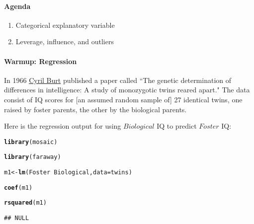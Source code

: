 \documentclass[10pt]{article}\usepackage[]{graphicx}\usepackage[]{color}
\makeatletter
\newcommand{\hlopt}[1]{\textcolor[rgb]{0,0,0}{#1}}%
\newcommand{\hlstd}[1]{\textcolor[rgb]{0.345,0.345,0.345}{#1}}%
\newcommand{\hlkwb}[1]{\textcolor[rgb]{0.69,0.353,0.396}{#1}}%
\newcommand{\hlkwc}[1]{\textcolor[rgb]{0.333,0.667,0.333}{#1}}%
\newcommand{\hlkwd}[1]{\textcolor[rgb]{0.737,0.353,0.396}{\textbf{#1}}}%
\newenvironment{kframe}{%
 \def\at@end@of@kframe{}%
 \ifinner\ifhmode%
  \def\at@end@of@kframe{\end{minipage}}%
  \begin{minipage}{\columnwidth}%
 \fi\fi%
 \def\FrameCommand##1{\hskip\@totalleftmargin \hskip-\fboxsep
 \colorbox{shadecolor}{##1}\hskip-\fboxsep
     \hskip-\linewidth \hskip-\@totalleftmargin \hskip\columnwidth}%
 \MakeFramed {\advance\hsize-\width
   \@totalleftmargin\z@ \linewidth\hsize
   \@setminipage}}%
 {\par\unskip\endMakeFramed%
 \at@end@of@kframe}
\newenvironment{knitrout}{}{} %
\makeatother
\begin{document}
\paragraph{Agenda}
\begin{enumerate}
  \itemsep0em
  \item Categorical explanatory variable
  \item Leverage, influence, and outliers
\end{enumerate}



\paragraph{Warmup: Regression}
In 1966 \href{http://en.wikipedia.org/wiki/Cyril_Burt}{Cyril Burt} published a paper called ``The genetic determination of differences in intelligence: A study of monozygotic twins reared apart." The data consist of IQ scores for [an assumed random sample of] 27 identical twins, one raised by foster parents, the other by the biological parents. 

Here is the regression output for using $Biological$ IQ to predict $Foster$ IQ:

\begin{knitrout}\footnotesize
{}\color{fgcolor}\begin{kframe}
\begin{alltt}
\hlkwd{library}\hlstd{(mosaic)}
\end{alltt}


{\ttfamily\noindent\color{warningcolor}{\#\# Warning: package 'dplyr' was built under R version 3.4.1}}\begin{alltt}
\hlkwd{library}\hlstd{(faraway)}
\end{alltt}


{\ttfamily\noindent\bfseries\color{errorcolor}{\#\# Error in library(faraway): there is no package called 'faraway'}}\begin{alltt}
\hlstd{m1} \hlkwb{<-} \hlkwd{lm}\hlstd{(Foster} \hlopt{~} \hlstd{Biological,} \hlkwc{data} \hlstd{= twins)}
\end{alltt}


{\ttfamily\noindent\bfseries\color{errorcolor}{\#\# Error in is.data.frame(data): object 'twins' not found}}\begin{alltt}
\hlkwd{coef}\hlstd{(m1)}
\end{alltt}


{\ttfamily\noindent\bfseries\color{errorcolor}{\#\# Error in coef(m1): object 'm1' not found}}\begin{alltt}
\hlkwd{rsquared}\hlstd{(m1)}
\end{alltt}


{\ttfamily\noindent\color{warningcolor}{\#\# Warning in summary(x, ...): restarting interrupted promise evaluation}}\begin{verbatim}
## NULL
\end{verbatim}
\end{kframe}
\end{knitrout}
\end{document}
